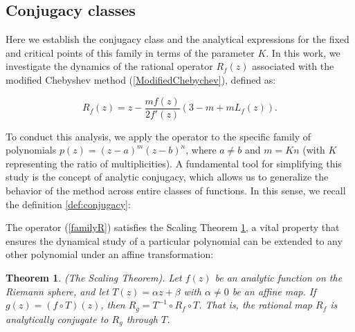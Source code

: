 \documentclass{article}
\newtheorem{theorem}{Theorem}[section]
\theoremstyle{definition}
\theoremstyle{remark}
\begin{document}
\subsection{Conjugacy classes}

Here we establish the conjugacy class  and the analytical expressions for the fixed and critical points  of this family in terms of the parameter $K$. In this work, we investigate the dynamics of the rational operator $R_f(z)$ associated with the modified Chebyshev method (\ref{ModifiedChebychev}), defined as:

\begin{equation}\label{familyR}
	R_f(z) = z - \frac{mf(z)}{2f'(z)}\left(3 - m + mL_f(z)\right).
\end{equation}

To conduct this analysis, we apply the operator to the specific family of polynomials $p(z) = (z-a)^m(z-b)^n$, where $a \neq b$ and $m = Kn$ (with $K$ representing the ratio of multiplicities). A fundamental tool for simplifying this study is the concept of analytic conjugacy, which allows us to generalize the behavior of the method across entire classes of functions. In this sense, we recall the definition \ref{def:conjugacy}:


The operator (\ref{familyR}) satisfies the Scaling Theorem \ref{t:scaling}, a vital property that ensures the dynamical study of a particular polynomial can be extended to any other polynomial under an affine transformation:

\begin{theorem}\label{t:scaling} (The Scaling Theorem).
	Let $f(z)$ be an analytic function on the Riemann sphere, and let $T(z)=\alpha z+\beta$ with $\alpha\neq0$ be an affine map. If $g(z)=(f \circ T)(z)$, then $R_g = T^{-1} \circ R_f \circ T$. That is, the rational map $R_f$ is analytically conjugate to $R_g$ through $T$.
\end{theorem}
\end{document}
